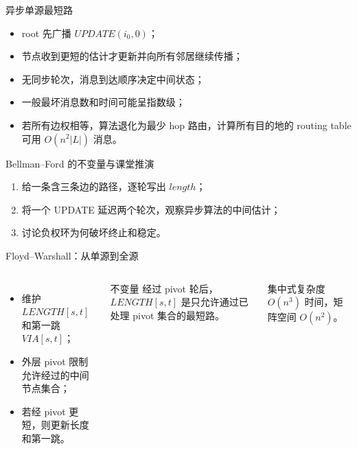 \documentclass[UTF8,fontset=none,aspectratio=169,10pt]{beamer}
\begin{document}
{\begin{frame}{异步单源最短路}
\begin{itemize}
  \item root 先广播 $UPDATE(i_0,0)$；
  \item 节点收到更短的估计才更新并向所有邻居继续传播；
  \item 无同步轮次，消息到达顺序决定中间状态；
  \item 一般最坏消息数和时间可能呈指数级；
  \item 若所有边权相等，算法退化为最少 hop 路由，计算所有目的地的 routing table 可用 $O(n^2|L|)$ 消息。
\end{itemize}
\end{frame}

\begin{frame}{Bellman--Ford 的不变量与课堂推演}
\begin{center}
\end{center}
\vfill
\begin{enumerate}
  \item 给一条含三条边的路径，逐轮写出 $length$；
  \item 将一个 UPDATE 延迟两个轮次，观察异步算法的中间估计；
  \item 讨论负权环为何破坏终止和稳定。
\end{enumerate}
\end{frame}

\begin{frame}{Floyd--Warshall：从单源到全源}
\begin{columns}[T,onlytextwidth]
\begin{itemize}
  \item 维护 $LENGTH[s,t]$ 和第一跳 $VIA[s,t]$；
  \item 外层 pivot 限制允许经过的中间节点集合；
  \item 若经 pivot 更短，则更新长度和第一跳。
\end{itemize}
\begin{block}{不变量}
经过 pivot 轮后，$LENGTH[s,t]$ 是只允许通过已处理 pivot 集合的最短路。
\end{block}
\begin{block}{集中式复杂度}
$O(n^3)$ 时间，矩阵空间 $O(n^2)$。
\end{block}
\end{columns}
\end{frame}

}
\end{document}
